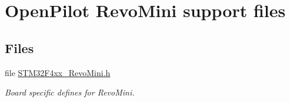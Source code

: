 \hypertarget{group___revo_mini}{\section{\-Open\-Pilot \-Revo\-Mini support files}
\label{group___revo_mini}
}
\subsection*{\-Files}
\begin{DoxyCompactItemize}
\item 
file \hyperlink{_s_t_m32_f4xx___revo_mini_8h}{\-S\-T\-M32\-F4xx\-\_\-\-Revo\-Mini.\-h}
\begin{DoxyCompactList}\small\item\em \-Board specific defines for \-Revo\-Mini. \end{DoxyCompactList}\end{DoxyCompactItemize}
